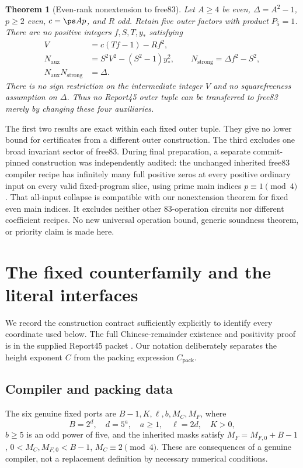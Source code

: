 \documentclass[11pt,letterpaper]{article}
\newtheorem{theorem}{Theorem}[section]
\theoremstyle{definition}\newtheorem{definition}[theorem]{Definition}
\theoremstyle{remark}\newtheorem{remark}[theorem]{Remark}
\newcommand{\D}{\Delta}
\newcommand{\Na}{N_{\mathrm{aux}}}\newcommand{\Nk}{N_{\mathrm{index}}}\newcommand{\Nt}{N_{\mathrm{transport}}}
\newcommand{\Ns}{N_{\mathrm{strong}}}
\begin{document}
\begin{theorem}[Even-rank nonextension to free83]
\label{fup:eh:thm:free}
Let $A\ge4$ be even, $\D=A^2-1$, $p\ge2$ even,
$c=\ps A p$, and $R$ odd. Retain five outer factors with product
$P_5=1$. There are no positive integers $f,S,T,y_*$ satisfying
\begin{align}
 V&=c(Tf-1)-Rf^2,\label{fup:eh:eq:freeV}\\
 \Na&=S^2V^2-(S^2-1)y_*^2,\qquad
 \Ns=\D f^2-S^2,\label{fup:eh:eq:freenorms}\\
 \Na\Ns&=\D.\label{fup:eh:eq:freeproduct}
\end{align}
There is no sign restriction on the intermediate integer $V$ and no
squarefreeness assumption on $\D$. Thus no Report45 outer tuple can
be transferred to free83 merely by changing these four auxiliaries.
\end{theorem}

The first two results are exact within each fixed outer tuple. They
give no lower bound for certificates from a different outer construction.
The third excludes one broad invariant sector of free83.
During final preparation, a separate commit-pinned construction was
independently audited: the unchanged inherited free83 compiler recipe
has infinitely many full positive zeros at every positive ordinary
input on every valid fixed-program slice, using prime main indices
$p\equiv1\pmod4$ \cite{fup:eh:primecollapse}. That all-input collapse is
compatible with our nonextension theorem for fixed even main indices.
It excludes neither other 83-operation circuits nor different
coefficient recipes. No new universal operation bound, generic
soundness theorem, or priority claim is made here.

\section{The fixed counterfamily and the literal interfaces}
\label{fup:eh:sec:setup}
We record the construction contract sufficiently explicitly to identify
every coordinate used below. The full Chinese-remainder existence and
positivity proof is in the supplied Report45 packet \cite{fup:eh:report45,fup:eh:base}.
Our notation deliberately separates the height exponent $C$ from the
packing expression $C_{\mathrm{pack}}$.

\subsection{Compiler and packing data}
The six genuine fixed ports are $B-1,K,\ell,b,M_C,M_F$, where
\[
 B=2^d,\quad d=5^a,\quad a\ge1,\quad \ell=2d,\quad K>0,
\]
$b\ge5$ is an odd power of five, and the inherited masks satisfy
$M_F=M_{F,0}+B-1$, $0<M_C,M_{F,0}<B-1$, $M_C\equiv2\pmod4$.
These are consequences of a genuine compiler, not a replacement
definition by necessary numerical conditions.
\end{document}
